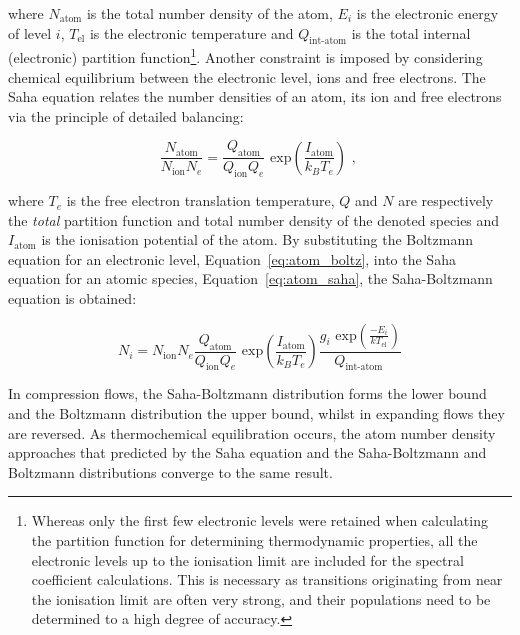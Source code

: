 \noindent where $N_\text{atom}$ is the total number density of the atom, $E_i$ is the electronic energy of level $i$, $T_\text{el}$ is the electronic temperature and $Q_\text{int-atom}$ is the total internal (electronic) partition function\footnote{Whereas only the first few electronic levels were retained when calculating the partition function for determining thermodynamic properties, all the electronic levels up to the ionisation limit are included for the spectral coefficient calculations.  This is necessary as transitions originating from near the ionisation limit are often very strong, and their populations need to be determined to a high degree of accuracy.}.
Another constraint is imposed by considering chemical equilibrium between the electronic level, ions and free electrons.
The Saha equation relates the number densities of an atom, its ion and free electrons via the principle of detailed balancing:

\begin{equation}
 \frac{ N_\text{atom} }{ N_\text{ion} N_e } = \frac{ Q_\text{atom} }{ Q_\text{ion} Q_e } \text{~exp} \left ( \frac{I_\text{atom}}{k_B T_e} \right ) \text{ , } \label{eq:atom_saha}
\end{equation}

\noindent where $T_e$ is the free electron translation temperature, $Q$ and $N$ are respectively the \textit{total} partition function and total number density of the denoted species  and $I_\text{atom}$ is the ionisation potential of the atom.
By substituting the Boltzmann equation for an electronic level, Equation~\ref{eq:atom_boltz}, into the Saha equation for an atomic species, Equation~\ref{eq:atom_saha}, the Saha-Boltzmann equation is obtained:

\begin{equation}
 N_i =  N_\text{ion} N_e \frac{ Q_\text{atom} }{ Q_\text{ion} Q_e }  \text{~exp} \left ( \frac{I_\text{atom}}{k_B T_e} \right ) \frac{ g_i \text{~exp} \left ( \frac{-E_i}{kT_\text{el}} \right ) }{ Q_\text{int-atom } } \label{eq:atom_saha}
\end{equation} 

In compression flows, the Saha-Boltzmann distribution forms the lower bound and the Boltzmann distribution the upper bound, whilst in expanding flows they are reversed.
As thermochemical equilibration occurs, the atom number density approaches that predicted by the Saha equation and the Saha-Boltzmann and Boltzmann distributions converge to the same result.

\par

